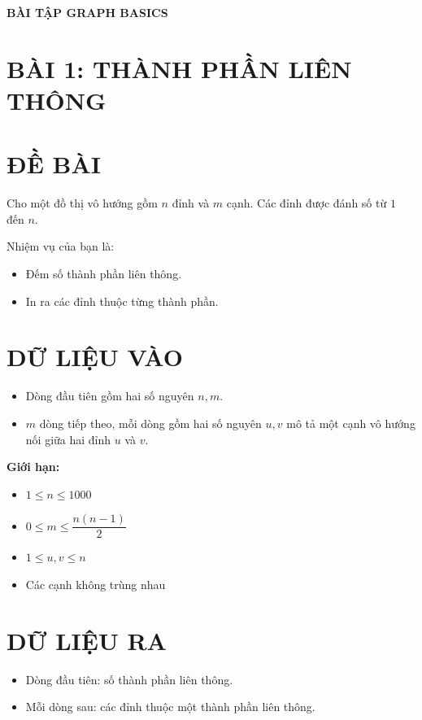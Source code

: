 \documentclass[a4paper,12pt]{article}
\begin{document}
\begin{center}
    \textbf{\Large BÀI TẬP GRAPH BASICS}
\end{center}

\section*{BÀI 1: THÀNH PHẦN LIÊN THÔNG}

\section*{ĐỀ BÀI}
Cho một đồ thị vô hướng gồm $n$ đỉnh và $m$ cạnh. Các đỉnh được đánh số từ $1$ đến $n$.

Nhiệm vụ của bạn là:
\begin{itemize}
    \item Đếm số thành phần liên thông.
    \item In ra các đỉnh thuộc từng thành phần.
\end{itemize}

\section*{DỮ LIỆU VÀO}
\begin{itemize}
    \item Dòng đầu tiên gồm hai số nguyên $n, m$.
    \item $m$ dòng tiếp theo, mỗi dòng gồm hai số nguyên $u, v$ mô tả một cạnh vô hướng nối giữa hai đỉnh $u$ và $v$.
\end{itemize}

\textbf{Giới hạn:}
\begin{itemize}
    \item $1 \le n \le 1000$
    \item $0 \le m \le \dfrac{n(n-1)}{2}$
    \item $1 \le u, v \le n$
    \item Các cạnh không trùng nhau
\end{itemize}

\section*{DỮ LIỆU RA}
\begin{itemize}
    \item Dòng đầu tiên: số thành phần liên thông.
    \item Mỗi dòng sau: các đỉnh thuộc một thành phần liên thông.
\end{itemize}
\end{document}
